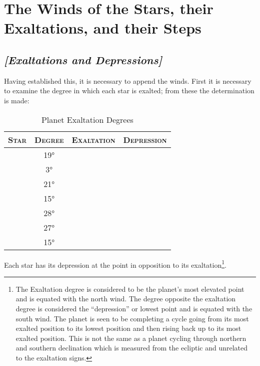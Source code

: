 \section{The Winds of the Stars, their Exaltations, and their Steps}
\subsection{\textit{[Exaltations and Depressions]}}
Having established this, it is necessary to append the winds. First it is necessary to examine the  degree in which each star is exalted; from these the determination is made:

\begin{table}[h]
\caption{Planet Exaltation Degrees}
\vspace{-1em}
\begin{center}
\begin{tabular}{cccc}
\toprule
\textsc{Star} & \textsc{Degree} 
	& \textsc{Exaltation} & \textsc{Depression} \\
\midrule
\Sun 		& 19°		& \Aries 			& \Libra			\\
\Moon		&   3° 		& \Taurus			& \Scorpio  		\\
\Saturn		& 21°		& \Libra			& \Aries			\\
\Jupiter		& 15°		& \Cancer			& \Capricorn		\\
\Mars		& 28°		& \Capricorn		& \Cancer 		\\
\Venus		& 27°		& \Pisces			& \Virgo 			\\
\Mercury	& 15°		& \Virgo			& \Pisces			\\
\bottomrule
\end{tabular}
\end{center}
\end{table}
\vspace{-1em}
Each star has its depression at the point in opposition to its exaltation\footnote{The Exaltation degree  is considered to be the planet's most elevated point and is equated with the north wind. The degree opposite the exaltation degree is considered the ``depression'' or lowest point and is equated with the south wind. The planet is seen to be completing a cycle going from its most exalted position to its lowest position and then rising back up to its most exalted position. This is not the same as a planet cycling through northern and southern declination which is measured from the ecliptic and unrelated to the exaltation signs.}.

